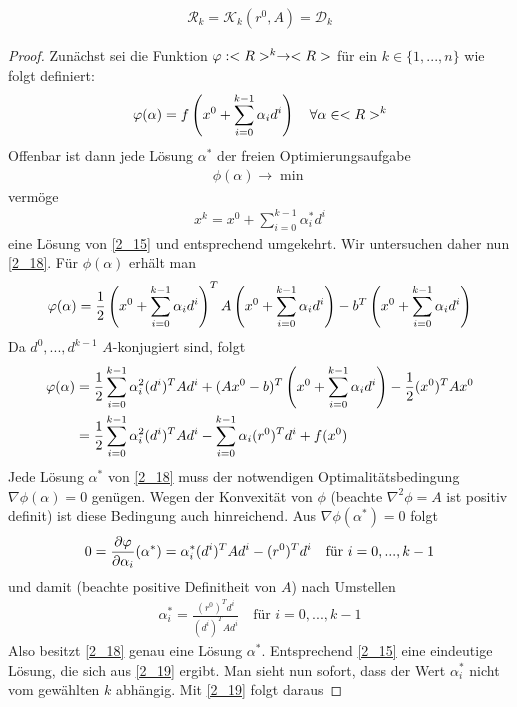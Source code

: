\begin{align}
	\label{2_23}
	\mathcal{R}_k = \mathcal{K}_k(r^0,A)=\mathcal{D}_k
\end{align}
\begin{proof}
	Zunächst sei die Funktion $\phi:\R^k\to\R$ für ein $k\in\{1,...,n\}$ wie folgt definiert:
	\begin{align}
		\phi(\alpha) = f\left(x ^0+\sum_{i=0}^{k-1}\alpha_id^i\right)\quad\forall\alpha\in\R^k\notag
	\end{align}
	Offenbar ist dann jede Lösung $\alpha^\ast$ der freien Optimierungsaufgabe 
	\begin{align}
		\label{2_18}
		\phi(\alpha)\to\min
	\end{align}
	vermöge
	\begin{align}
		\label{2_19}
		x^k = x^0+\sum_{i=0}^{k-1}\alpha^\ast_id^i
	\end{align}
	eine Lösung von \cref{2_15} und entsprechend umgekehrt. Wir untersuchen daher nun \cref{2_18}. Für $\phi(\alpha)$ erhält man
	\begin{align}
		\phi(\alpha) = \frac{1}{2}\left(x^0+\sum_{i=0}^{k-1}\alpha_id^i\right)^TA\left(x^0+\sum_{i=0}^{k-1}\alpha_id^i\right) - b^T\left(x^0+\sum_{i=0}^{k-1}\alpha_id^i\right)\notag
	\end{align}
	Da $d^0,...,d^{k-1}$ $A$-konjugiert sind, folgt
	\begin{align}
		\phi(\alpha) &= \frac{1}{2}\sum_{i=0}^{k-1}\alpha_i^2(d^i)^TAd^i + (Ax^0-b)^T\left(x^0 + \sum_{i=0}^{k-1}\alpha_i d^i\right) - \frac{1}{2}(x^0)^TAx^0 \notag \\
		&= \frac{1}{2}\sum_{i=0}^{k-1}\alpha_i^2(d^i)^TAd^i - \sum_{i=0}^{k-1}\alpha_i(r^0)^Td^i + f(x^0)\notag
	\end{align}
	Jede Lösung $\alpha^\ast$ von \cref{2_18} muss der notwendigen Optimalitätsbedingung $\nabla\phi(\alpha)=0$ genügen. Wegen der Konvexität von $\phi$ (beachte $\nabla^2\phi = A$ ist positiv definit) ist diese Bedingung auch hinreichend. Aus $\nabla\phi(\alpha^\ast)=0$ folgt
	\begin{align}
		0=\frac{\partial \phi}{\partial\alpha_i}(\alpha^\ast) =\alpha^\ast_i(d^i)^TAd^i-(r^0)^Td^i\quad\text{für } i=0,...,k-1\notag 
	\end{align}
	und damit (beachte positive Definitheit von $A$) nach Umstellen
	\begin{align}
		\label{2_20}
		\alpha_i^\ast = \frac{(r^0)^Td^i}{(d^i)^TAd^i}\quad\text{für } i=0,...,k-1
	\end{align}
	Also besitzt \cref{2_18} genau eine Lösung $\alpha^\ast$. Entsprechend \cref{2_15} eine eindeutige Lösung, die sich aus \cref{2_19} ergibt. Man sieht nun sofort, dass der Wert $\alpha_i^\ast$ nicht vom gewählten $k$ abhängig. Mit \cref{2_19} folgt daraus

\end{proof}
